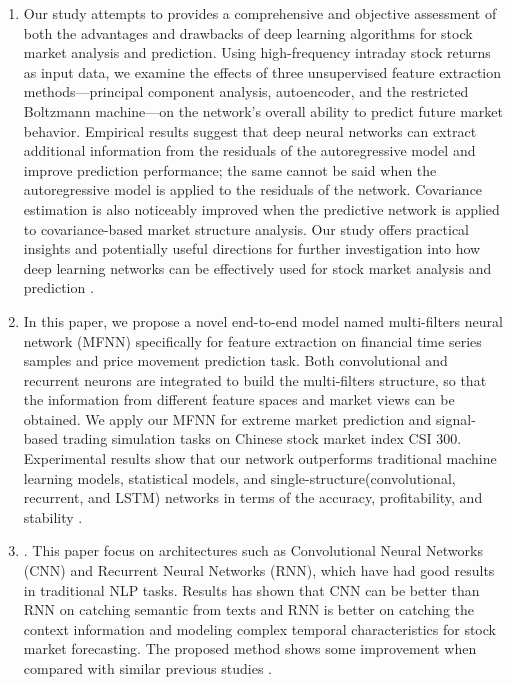 \documentclass[12pt,journal,compsoc]{IEEEtran}
\begin{document}
\begin{enumerate}
	\item Our study attempts to provides a comprehensive and objective assessment of both the advantages and drawbacks of deep learning algorithms for stock market analysis and prediction. Using high-frequency intraday stock returns as input data, we examine the effects of three unsupervised feature extraction methods—principal component analysis, autoencoder, and the restricted Boltzmann machine—on the network’s overall ability to predict future market behavior. Empirical results suggest that deep neural networks can extract additional information from the residuals of the autoregressive model and improve prediction performance; the same cannot be said when the autoregressive model is applied to the residuals of the network. Covariance estimation is also noticeably improved when the predictive network is applied to covariance-based market structure analysis. Our study offers practical insights and potentially useful directions for further investigation into how deep learning networks can be effectively used for stock market analysis and prediction \cite{chong2017deep}.
	
	\item In this paper, we propose a novel end-to-end model named multi-filters neural network (MFNN) specifically for feature extraction on financial time series samples and price movement prediction task. Both convolutional and recurrent neurons are integrated to build the multi-filters structure, so that the information from different feature spaces and market views can be obtained. We apply our MFNN for extreme market prediction and signal-based trading simulation tasks on Chinese stock market index CSI 300. Experimental results show that our network outperforms traditional machine learning models, statistical models, and single-structure(convolutional, recurrent, and LSTM) networks in terms of the accuracy, profitability, and stability \cite{long2019deep}.
	
	\item . This paper focus  on  architectures  such  as  Convolutional  Neural  Networks  (CNN) and Recurrent Neural Networks (RNN), which have had good  results  in  traditional  NLP  tasks.  Results  has  shown  that  CNN  can  be  better  than  RNN  on  catching  semantic  from  texts  and  RNN  is  better  on  catching  the  context  information  and  modeling  complex  temporal  characteristics  for  stock  market  forecasting.  The  proposed  method  shows  some  improvement  when compared with similar previous studies \cite{vargas2017deep}.
	

\end{enumerate}
\end{document}
